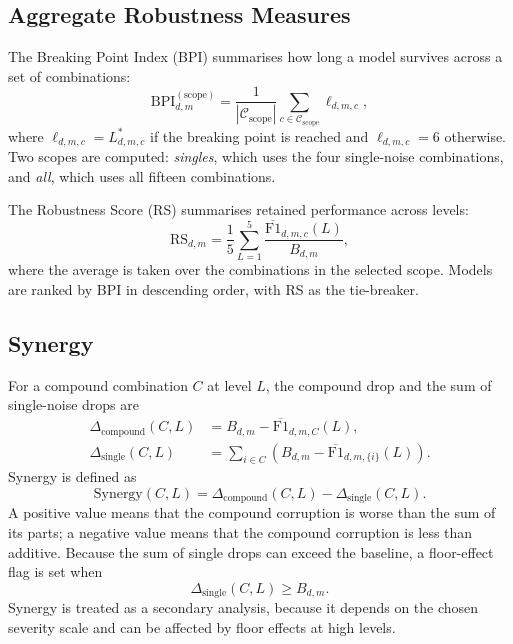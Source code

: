 \subsection{Aggregate Robustness Measures}

The Breaking Point Index (BPI) summarises how long a model survives across a set of combinations:
\begin{equation}
\text{BPI}_{d,m}^{(\text{scope})} = \frac{1}{|\mathcal{C}_{\text{scope}}|}\sum_{c \in \mathcal{C}_{\text{scope}}} \ell_{d,m,c},
\end{equation}
where $\ell_{d,m,c} = L^{*}_{d,m,c}$ if the breaking point is reached and $\ell_{d,m,c}=6$ otherwise. Two scopes are computed: \emph{singles}, which uses the four single-noise combinations, and \emph{all}, which uses all fifteen combinations.

The Robustness Score (RS) summarises retained performance across levels:
\begin{equation}
\text{RS}_{d,m} = \frac{1}{5}\sum_{L=1}^{5} \frac{\overline{\text{F1}}_{d,m,c}(L)}{B_{d,m}},
\end{equation}
where the average is taken over the combinations in the selected scope. Models are ranked by BPI in descending order, with RS as the tie-breaker.

\subsection{Synergy}

For a compound combination $C$ at level $L$, the compound drop and the sum of single-noise drops are
\begin{align}
\Delta_{\text{compound}}(C,L) &= B_{d,m} - \overline{\text{F1}}_{d,m,C}(L), \\
\Delta_{\text{single}}(C,L) &= \sum_{i \in C} \left( B_{d,m} - \overline{\text{F1}}_{d,m,\{i\}}(L) \right).
\end{align}
Synergy is defined as
\begin{equation}
\text{Synergy}(C,L) = \Delta_{\text{compound}}(C,L) - \Delta_{\text{single}}(C,L).
\end{equation}
A positive value means that the compound corruption is worse than the sum of its parts; a negative value means that the compound corruption is less than additive. Because the sum of single drops can exceed the baseline, a floor-effect flag is set when
\begin{equation}
\Delta_{\text{single}}(C,L) \geq B_{d,m}.
\end{equation}
Synergy is treated as a secondary analysis, because it depends on the chosen severity scale and can be affected by floor effects at high levels.

